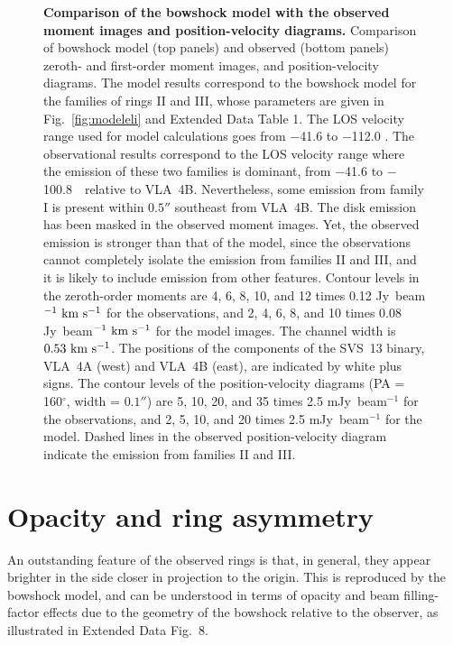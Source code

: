 \documentclass[12pt]{mythesis}
\begin{document}
\begin{figure}[p!]
\begin{center}
\caption[Comparison of the bowshock model with the observed moment images and position-velocity diagrams]{{\bf Comparison of the bowshock model with the observed moment images and position-velocity diagrams.} Comparison of bowshock model (top panels) and observed (bottom panels) zeroth- and first-order moment images, and position-velocity diagrams. The model results correspond to the bowshock model for the families of rings II and III, whose parameters are given in Fig.~\ref{fig:modeleli} and Extended Data Table 1. The LOS velocity range used for model calculations goes from $-$41.6 to $-$112.0 \kms. 
	The observational results correspond to the LOS velocity range where the emission of these two families is dominant, from $-$41.6 to $-$100.8~\kms\ relative to VLA~4B. Nevertheless, some emission from family I is present within $0.5''$ southeast from VLA~4B. The disk emission has been masked in the observed moment images. Yet, the observed emission is stronger than that of the model, since the observations cannot completely isolate the emission from families II and III, and it is likely to include emission from other features. Contour levels in the zeroth-order moments are 4, 6, 8, 10, and 12 times 0.12 Jy~beam$^{-1}~\mbox{km s$^{-1}$}$ for the observations, and 2, 4, 6, 8, and 10 times 0.08 Jy~beam$^{-1}~\mbox{km s$^{-1}$}$ for the model images. The channel width is $0.53~\mbox{km s$^{-1}$}$. The positions of the components of the SVS~13 binary, VLA~4A (west) and VLA~4B (east), are indicated by white plus signs. The contour levels of the position-velocity diagrams (PA = 160$^\circ$, width = $0.1''$) are 5, 10, 20, and 35 times 2.5 mJy~beam$^{-1}$ for the observations, and 2, 5, 10, and 20 times 2.5 mJy~beam$^{-1}$ for the model. Dashed lines in the observed position-velocity diagram indicate the emission from families II and III.
}
\label{fig:modelpv} %
\end{center}
\end{figure}




\section{Opacity and ring asymmetry}\label{sec:opacity}

An outstanding feature of the observed rings is that, in general, they appear brighter in the side closer in projection to the origin. This is reproduced by the bowshock model, and can be understood in terms of opacity and beam filling-factor effects due to the geometry of the bowshock relative to the observer, as illustrated in Extended Data Fig.~8.
\end{document}
